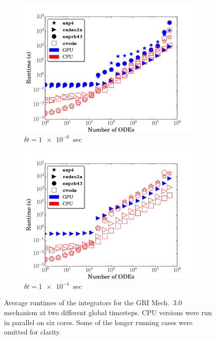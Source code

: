 \documentclass[preprint]{elsarticle}
\begin{document}
\begin{figure}
  \centering
  \begin{subfigure}{0.49\textwidth}
      \includegraphics[width=\linewidth]{GRI_1e-06_cpuvsgpu.pdf}
      \caption{$\delta t = \SI{1e-6}{\sec}$}
  \end{subfigure}
  \begin{subfigure}{0.49\textwidth}
      \includegraphics[width=\linewidth]{GRI_1e-04_cpuvsgpu.pdf}
      \caption{$\delta t = \SI{1e-4}{\sec}$}
  \end{subfigure}
  \caption{Average runtimes of the integrators for the GRI Mech.~3.0 mechanism at two different global timesteps. 
  CPU versions were run in parallel on six cores.
  Some of the longer running cases were omitted for clarity.}
  \label{F:GRI_perf}
\end{figure}
\end{document}
